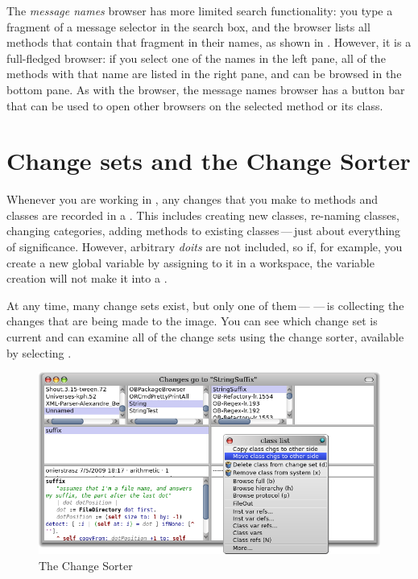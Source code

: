 \documentclass[a4paper,10pt,twoside]{book}
\begin{document}
The \emph{message names} browser has more limited search functionality: you type a fragment of a message selector in the search box, and the browser lists all methods that contain that fragment in their names, as shown in .
However, it is a full-fledged browser:
if you select one of the names in the left pane, all of the methods with that name are listed in the right pane, and can be browsed in the bottom pane.
As with the browser, the message names browser has a button bar that can be used to open other  browsers on the selected method or its class.



\section{Change sets and the Change Sorter}

Whenever you are working in \pharo, any changes that you make to methods and classes are recorded in a .
This includes creating new classes, re-naming classes, changing categories, adding methods to existing classes\,---\,just about everything of significance.  
However, arbitrary \emph{doits} are not included, so if, for example, you create a new global variable by assigning to it in a workspace, the variable creation will not make it into a .

At any time, many change sets exist, but only one of them\,---\,\,---\,is collecting the changes that are being made to the image.  
You can see which change set is current and can examine all of the change sets using the  change sorter, available by selecting .

\begin{figure}[btp]
	\begin{center}
		\includegraphics[width=\linewidth]{changeSorter}
	\end{center}
	\caption{The Change Sorter}
\end{figure}
\end{document}
